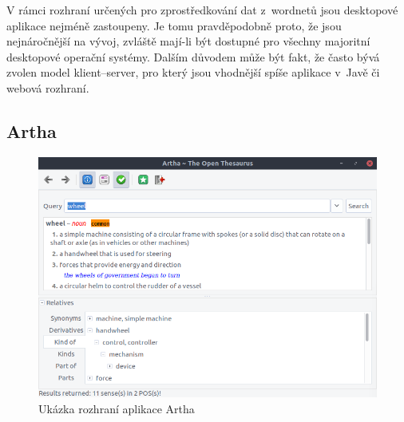 \documentclass[a4paper, 11pt, oneside, showtrims]{book}
\begin{document}
			V rámci rozhraní určených pro zprostředkování dat z~wordnetů jsou desktopové aplikace nejméně zastoupeny. Je tomu pravděpodobně proto, že jsou nejnáročnější na vývoj, zvláště mají-li být dostupné pro všechny majoritní desktopové operační systémy. Dalším důvodem může být fakt, že často bývá zvolen model klient--server, pro který jsou vhodnější spíše aplikace v~Javě \parencite[13]{gosling1995java} či webová rozhraní.

			\subsection{Artha}

				\begin{figure}[h]
					\centering
					\includegraphics[width=1.0\textwidth]{wnartha-ubuntu.png}
					\caption{Ukázka rozhraní aplikace Artha}
					\label{fig:wnartha-ubuntu}
				\end{figure}
\end{document}
